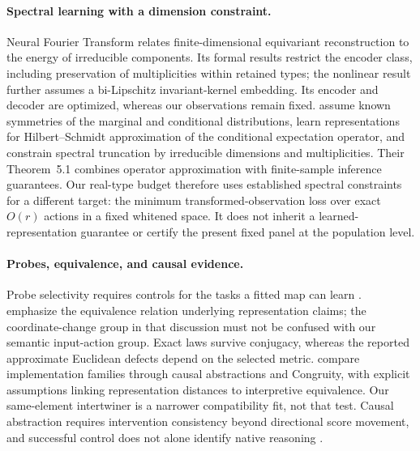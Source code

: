 \paragraph{Spectral learning with a dimension constraint.}
Neural Fourier Transform \citep[Theorem~4.2 and Appendix~C.3]{koyama2024fourier} relates finite-dimensional equivariant reconstruction to the energy of irreducible components. Its formal results restrict the encoder class, including preservation of multiplicities within retained types; the nonlinear result further assumes a bi-Lipschitz invariant-kernel embedding. Its encoder and decoder are optimized, whereas our observations remain fixed. \citet[Sections~3--5 and Appendix~J.2]{ordonez2026inference} assume known symmetries of the marginal and conditional distributions, learn representations for Hilbert--Schmidt approximation of the conditional expectation operator, and constrain spectral truncation by irreducible dimensions and multiplicities. Their Theorem~5.1 combines operator approximation with finite-sample inference guarantees. Our real-type budget therefore uses established spectral constraints for a different target: the minimum transformed-observation loss over exact $O(r)$ actions in a fixed whitened space. It does not inherit a learned-representation guarantee or certify the present fixed panel at the population level.

\paragraph{Probes, equivalence, and causal evidence.}
Probe selectivity requires controls for the tasks a fitted map can learn \citep{hewitt2019designing}. \citet{yao2026groupaction} emphasize the equivalence relation underlying representation claims; the coordinate-change group in that discussion must not be confused with our semantic input-action group. Exact laws survive conjugacy, whereas the reported approximate Euclidean defects depend on the selected metric. \citet{sun2026tracking} compare implementation families through causal abstractions and Congruity, with explicit assumptions linking representation distances to interpretive equivalence. Our same-element intertwiner is a narrower compatibility fit, not that test. Causal abstraction requires intervention consistency beyond directional score movement, and successful control does not alone identify native reasoning \citep{geiger2022inducing,geiger2025causal}.

